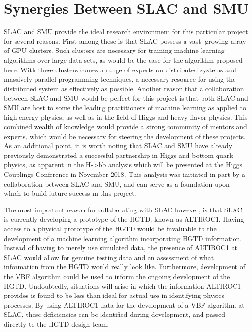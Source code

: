 \documentclass[12pt,letterpaper]{article}
\begin{document}
\section*{Synergies Between SLAC and SMU}
    SLAC and SMU provide the ideal research environment for this particular project for several reasons. First among these is that SLAC possess a vast, growing array of GPU clusters. Such clusters are necessary for training machine learning algorithms over large data sets, as would be the case for the algorithm proposed here. With these clusters comes a range of experts on distributed systems and massively parallel programming techniques, a necessary resource for using the distributed system as effectively as possible. Another reason that a collaboration between SLAC and SMU would be perfect for this project is that both SLAC and SMU are host to some the leading practitioners of machine learning as applied to high energy physics, as well as in the field of Higgs and heavy flavor physics. This combined wealth of knowledge would provide a strong community of mentors and experts, which would be necessary for steering the development of these projects. As an additional point, it is worth noting that SLAC and SMU have already previously demonstrated a successful partnership in Higgs and bottom quark physics, as apparent in the H->bb analysis which will be presented at the Higgs Couplings Conference in November 2018. This analysis was initiated in part by a collaboration between SLAC and SMU, and can serve as a foundation upon which to build future success in this project.
    
    The most important reason for collaborating with SLAC however, is that SLAC is currently developing a prototype of the HGTD, known as ALTIROC1. Having access to a physical prototype of the HGTD would be invaluable to the development of a machine learning algorithm incorporating HGTD information. Instead of having to merely use simulated data, the presence of ALTIROC1 at SLAC would allow for genuine testing data and an assessment of what information from the HGTD would really look like. Furthermore, development of the VBF algorithm could be used to inform the ongoing development of the HGTD. Undoubtedly, situations will arise in which the information ALTIROC1 provides is found to be less than ideal for actual use in identifying physics processes. By using ALTIROC1 data for the development of a VBF algorithm at SLAC, these deficiencies can be identified during development, and passed directly to the HGTD design team. 
\end{document}
